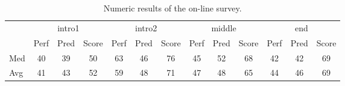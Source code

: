 \begin{table}
\centering
 
  \footnotesize
\begin{tabular}{l|ccc|ccc|ccc|ccc}

\hline
& \multicolumn{3}{c|}{intro1} & \multicolumn{3}{c|}{intro2} & \multicolumn{3}{c|}{middle}  & \multicolumn{3}{c}{end} \\ 
& Perf & Pred & Score & Perf & Pred & Score & Perf & Pred & Score & Perf & Pred & Score \\ \hline

Med & 40 & 39 & 50	& 63 & 46 & 76 & 45 & 52 & 68 & 42 & 42 & 69 \\
Avg & 41 & 43 & 52 & 59 & 48 & 71 & 47 & 48 & 65 & 44 & 46 & 69\\ \hline
\end{tabular}


 \caption[Numeric results of the on-line survey.]{Numeric results of the on-line survey.}
  \label{tab:survey_results_redux}
\end{table}
